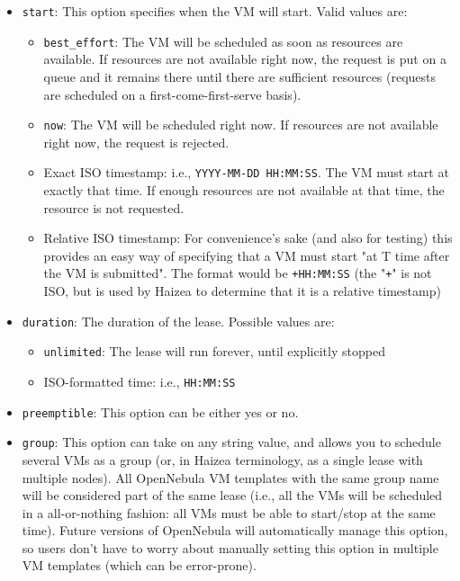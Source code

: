 \begin{itemize}
\item \texttt{start}: This option specifies when the VM will start. Valid values are:
\begin{itemize}
\item \texttt{best\_effort}: The VM will be scheduled as soon as resources are available. If resources are not available right now, the request is put on a queue and it remains there until there are sufficient resources (requests are scheduled on a first-come-first-serve basis).
\item \texttt{now}: The VM will be scheduled right now. If resources are not available right now, the request is rejected.
\item Exact ISO timestamp: i.e., \texttt{YYYY-MM-DD HH:MM:SS}. The VM must start at exactly that time. If enough resources are not available at that time, the resource is not requested.
\item Relative ISO timestamp: For convenience's sake (and also for testing) this provides an easy way of specifying that a VM must start "at T time after the VM is submitted". The format would be \texttt{+HH:MM:SS} (the "\texttt{+}" is not ISO, but is used by Haizea to determine that it is a relative timestamp)
\end{itemize}
\item \texttt{duration}: The duration of the lease. Possible values are:
\begin{itemize}
\item \texttt{unlimited}: The lease will run forever, until explicitly stopped
\item ISO-formatted time: i.e., \texttt{HH:MM:SS}
\end{itemize}
\item \texttt{preemptible}: This option can be either yes or no. %
\item \texttt{group}: This option can take on any string value, and allows you to schedule several VMs as a group (or, in Haizea terminology, as a single lease with multiple nodes). All OpenNebula VM templates with the same group name will be considered part of the same lease (i.e., all the VMs will be scheduled in a all-or-nothing fashion: all VMs must be able to start/stop at the same time). Future versions of OpenNebula will automatically manage this option, so users don't have to worry about manually setting this option in multiple VM templates (which can be error-prone). 
\end{itemize}

